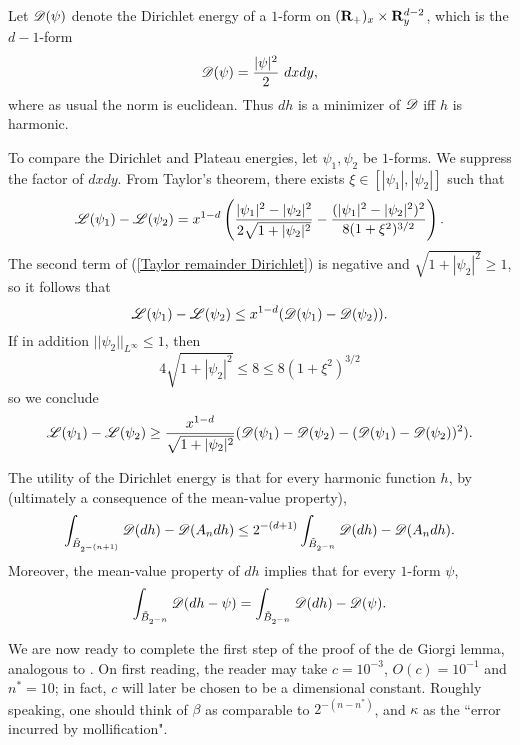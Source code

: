 \begin{notation}
Let $\mathscr D(\psi)$ denote the Dirichlet energy of a $1$-form on $(\mathbf{R}_+)_x \times \mathbf{R}^{d - 2}_y$, which is the $d-1$-form
$$\mathscr D(\psi) = \frac{|\psi|^2}{2} ~dxdy,$$
where as usual the norm is euclidean.
Thus $dh$ is a minimizer of $\mathscr D$ iff $h$ is harmonic.
\end{notation}

To compare the Dirichlet and Plateau energies, let $\psi_1, \psi_2$ be $1$-forms.
We suppress the factor of $dxdy$.
From Taylor's theorem, there exists $\xi \in [|\psi_1|, |\psi_2|]$ such that
\begin{equation}\label{Taylor remainder Dirichlet}
\mathscr L(\psi_1) - \mathscr L(\psi_2) = x^{1 - d}\left(\frac{|\psi_1|^2 - |\psi_2|^2}{2\sqrt{1 + |\psi_2|^2}} - \frac{(|\psi_1|^2 - |\psi_2|^2)^2}{8(1 + \xi^2)^{3/2}}\right).
\end{equation}
The second term of (\ref{Taylor remainder Dirichlet}) is negative and $\sqrt{1 + |\psi_2|^2} \geq 1$, so it follows that
\begin{equation}\label{Taylor lower bound}
\mathscr L(\psi_1) - \mathscr L(\psi_2) \leq x^{1 - d} (\mathscr D(\psi_1) - \mathscr D(\psi_2)).
\end{equation}
If in addition $||\psi_2||_{L^\infty} \leq 1$, then
$$4\sqrt{1 + |\psi_2|^2} \leq 8 \leq 8(1 + \xi^2)^{3/2}$$
so we conclude
\begin{equation}\label{Taylor upper bound}
\mathscr L(\psi_1) - \mathscr L(\psi_2) \geq \frac{x^{1 - d}}{\sqrt{1 + |\psi_2|^2}} (\mathscr D(\psi_1) - \mathscr D(\psi_2) - (\mathscr D(\psi_1) - \mathscr D(\psi_2))^2).
\end{equation}

The utility of the Dirichlet energy is that for every harmonic function $h$, by \cite[Lemma 4.1]{Miranda66} (ultimately a consequence of the mean-value property),
\begin{equation}\label{Miranda41}
\int_{\tilde B_{2^{-(n+1)}}} \mathscr D(dh) - \mathscr D(A_n dh) \leq 2^{-(d + 1)} \int_{\tilde B_{2^{-n}}} \mathscr D(dh) - \mathscr D(A_n dh).
\end{equation}
Moreover, the mean-value property of $dh$ implies that for every $1$-form $\psi$,
\begin{equation}\label{MVP derivative}
\int_{\tilde B_{2^{-n}}} \mathscr D(dh - \psi) = \int_{\tilde B_{2^{-n}}} \mathscr D(dh) - \mathscr D(\psi).
\end{equation}

We are now ready to complete the first step of the proof of the de Giorgi lemma, analogous to \cite[Teorema 4.3]{Miranda66}.
On first reading, the reader may take $c = 10^{-3}$, $O(c) = 10^{-1}$ and $n^* = 10$; in fact, $c$ will later be chosen to be a dimensional constant.
Roughly speaking, one should think of $\beta$ as comparable to $2^{-(n - n^*)}$, and $\kappa$ as the ``error incurred by mollification".

